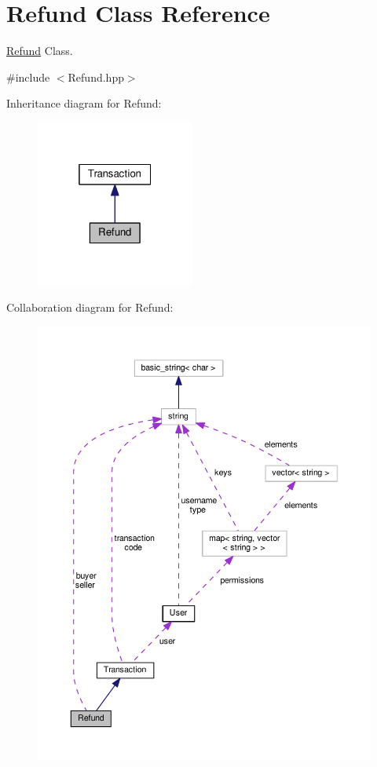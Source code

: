 \hypertarget{class_refund}{\section{Refund Class Reference}
\label{class_refund}
}


\hyperlink{class_refund}{Refund} Class.  




{\ttfamily \#include $<$Refund.\-hpp$>$}



Inheritance diagram for Refund\-:\nopagebreak
\begin{figure}[H]
\begin{center}
\leavevmode
\includegraphics[width=148pt]{class_refund__inherit__graph}
\end{center}
\end{figure}


Collaboration diagram for Refund\-:\nopagebreak
\begin{figure}[H]
\begin{center}
\leavevmode
\includegraphics[width=350pt]{class_refund__coll__graph}
\end{center}
\end{figure}
